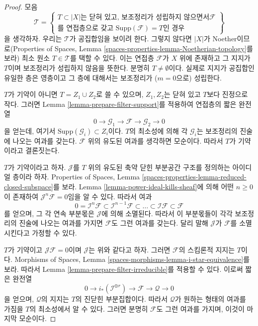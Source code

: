 \begin{proof}
모음
$$
\mathcal{T} =
\left\{
\begin{matrix}
T \subset |X|
\text{는 닫혀 있고, 보조정리가 성립하지 않으면서}
\mathcal{F} \\
\text{를 연접층으로 갖고 }
\text{Supp}(\mathcal{F}) = T
\text{인 경우}
\end{matrix}
\right\}
$$
을 생각하자. 우리는 $\mathcal{T}$가 공집합임을 보이려 한다. 그렇지
않다면 $|X|$가 Noether이므로(Properties of Spaces, Lemma
\ref{spaces-properties-lemma-Noetherian-topology}를 보라) 최소 원소
$T \in \mathcal{T}$를 택할 수 있다. 이는 연접층 $\mathcal{F}$가
$X$ 위에 존재하고 그 지지가 $T$이며 보조정리가 성립하지 않음을 뜻한다.
분명히 $T \not = \emptyset$이다. 실제로 지지가 공집합인 유일한 층은
영층이고 그 층에 대해서는 보조정리가 ($m = 0$으로) 성립한다.

\medskip\noindent
$T$가 기약이 아니면 $T = Z_1 \cup Z_2$로 쓸 수 있으며,
$Z_1, Z_2$는 닫혀 있고 $T$보다 진정으로 작다.
그러면 Lemma \ref{lemma-prepare-filter-support}를 적용하여 연접층의
짧은 완전열
$$
0 \to
\mathcal{G}_1 \to
\mathcal{F} \to
\mathcal{G}_2 \to 0
$$
을 얻는데, 여기서 $\text{Supp}(\mathcal{G}_i) \subset Z_i$이다.
$T$의 최소성에 의해 각 $\mathcal{G}_i$는 보조정리의 진술에 나오는
여과를 갖는다. $\mathcal{F}$ 위의 유도된 여과를 생각하면 모순이다.
따라서 $T$가 기약이라고 결론짓는다.

\medskip\noindent
$T$가 기약이라고 하자. $\mathcal{J}$를 $T$ 위의 유도된 축약 닫힌
부분공간 구조를 정의하는 아이디얼 층이라 하자. Properties of Spaces,
Lemma \ref{spaces-properties-lemma-reduced-closed-subspace}를 보라.
Lemma \ref{lemma-power-ideal-kills-sheaf}에 의해 어떤 $n \geq 0$이
존재하여 $\mathcal{J}^n\mathcal{F} = 0$임을 알 수 있다. 따라서 여과
$$
0 = \mathcal{I}^n\mathcal{F} \subset \mathcal{I}^{n - 1}\mathcal{F}
\subset \ldots \subset \mathcal{I}\mathcal{F} \subset \mathcal{F}
$$
를 얻으며, 그 각 연속 부분몫은 $\mathcal{J}$에 의해 소멸된다.
따라서 이 부분몫들이 각각 보조정리의 진술에 나오는 여과를 가지면
$\mathcal{F}$도 그런 여과를 갖는다. 달리 말해 $\mathcal{J}$가
$\mathcal{F}$를 소멸시킨다고 가정할 수 있다.

\medskip\noindent
$T$가 기약이고 $\mathcal{J}\mathcal{F} = 0$이며 $\mathcal{J}$는
위와 같다고 하자. 그러면 $\mathcal{F}$의 스킴론적 지지는 $T$이다.
Morphisms of Spaces, Lemma
\ref{spaces-morphisms-lemma-i-star-equivalence}를 보라. 따라서 Lemma
\ref{lemma-prepare-filter-irreducible}를 적용할 수 있다. 이로써 짧은 완전열
$$
0 \to
i_*(\mathcal{I}^{\oplus r}) \to
\mathcal{F} \to
\mathcal{Q} \to 0
$$
을 얻으며, $\mathcal{Q}$의 지지는 $T$의 진닫힌 부분집합이다.
따라서 $\mathcal{Q}$가 원하는 형태의 여과를 가짐을 $T$의 최소성에서
알 수 있다. 그러면 분명히 $\mathcal{F}$도 그런 여과를 가지며,
이것이 마지막 모순이다.
\end{proof}

